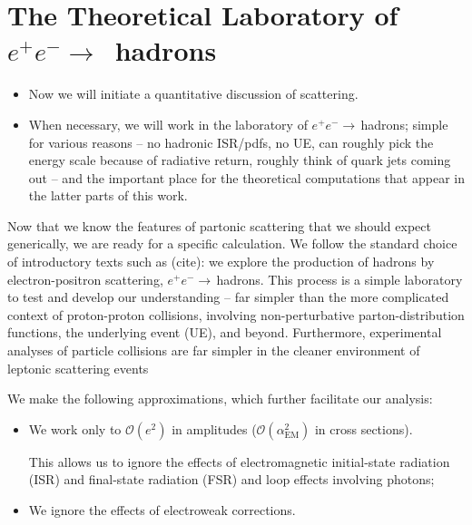 \section{The Theoretical Laboratory of \texorpdfstring{\(e^+ e^- \to \,\) hadrons}{e+e- -> hadrons}}
\label{sec:partonic-scattering}

\begin{itemize}
    \item
Now we will initiate a quantitative discussion of scattering.

    \item
When necessary, we will work in the laboratory of \(e^+ e^-\to\,\)hadrons;
%
simple for various reasons -- no hadronic ISR/pdfs, no UE, can roughly pick the energy scale because of radiative return, roughly think of quark jets coming out -- and the important place for the theoretical computations that appear in the latter parts of this work.
\end{itemize}











Now that we know the features of partonic scattering that we should expect generically, we are ready for a specific calculation.
%
We follow the standard choice of introductory texts such as (cite):
%
we explore the production of hadrons by electron-positron scattering, \(e^+ e^-\to\,\)hadrons.
%
This process is a simple laboratory to test and develop our understanding -- far simpler than the more complicated context of proton-proton collisions, involving non-perturbative parton-distribution functions, the underlying event (UE), and beyond.
%
Furthermore, experimental analyses of particle collisions are far simpler in the cleaner environment of leptonic scattering events

We make the following approximations, which further facilitate our analysis:
\begin{itemize}
    \item
    We work only to \(\mathcal{O}(e^2)\) in amplitudes (\(\mathcal{O}(\alpha_\text{EM}^2)\) in cross sections).

    This allows us to ignore the effects of electromagnetic initial-state radiation (ISR) and final-state radiation (FSR) and loop effects involving photons;

    \item
    We ignore the effects of electroweak corrections.
\end{itemize}

